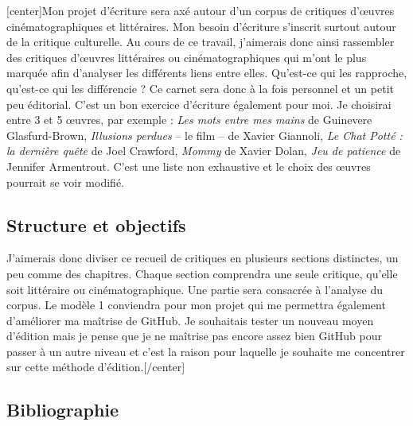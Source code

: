 \documentclass[12pt,french,letterpaper]{article}
\begin{document}
\normalsize{{[}center{]}Mon projet d'écriture sera axé autour d'un
corpus de critiques d'œuvres cinématographiques et littéraires. Mon
besoin d'écriture s'inscrit surtout autour de la critique culturelle. Au
cours de ce travail, j'aimerais donc ainsi rassembler des critiques
d'œuvres littéraires ou cinématographiques qui m'ont le plus marquée
afin d'analyser les différents liens entre elles. Qu'est-ce qui les
rapproche, qu'est-ce qui les différencie ? Ce carnet sera donc à la fois
personnel et un petit peu éditorial. C'est un bon exercice d'écriture
également pour moi. Je choisirai entre 3 et 5 œuvres, par exemple :
\emph{Les mots entre mes mains} de Guinevere Glasfurd-Brown,
\emph{Illusions perdues} -- le film -- de Xavier Giannoli, \emph{Le Chat
Potté : la dernière quête} de Joel Crawford, \emph{Mommy} de Xavier
Dolan, \emph{Jeu de patience} de Jennifer Armentrout. C'est une liste
non exhaustive et le choix des œuvres pourrait se voir modifié.

\hypertarget{structure-et-objectifs}{%
\subsection{Structure et objectifs}\label{structure-et-objectifs}}

J'aimerais donc diviser ce recueil de critiques en plusieurs sections
distinctes, un peu comme des chapitres. Chaque section comprendra une
seule critique, qu'elle soit littéraire ou cinématographique. Une partie
sera consacrée à l'analyse du corpus. Le modèle 1 conviendra pour mon
projet qui me permettra également d'améliorer ma maîtrise de GitHub. Je
souhaitais tester un nouveau moyen d'édition mais je pense que je ne
maîtrise pas encore assez bien GitHub pour passer à un autre niveau et
c'est la raison pour laquelle je souhaite me concentrer sur cette
méthode d'édition.{[}/center{]}

\newpage

\hypertarget{bibliographie}{%
\subsection{Bibliographie}\label{bibliographie}}}
\end{document}
